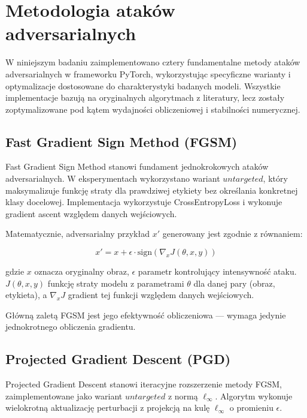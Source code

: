 \documentclass[12pt]{article}
\begin{document}
\section{Metodologia ataków adversarialnych}

W niniejszym badaniu zaimplementowano cztery fundamentalne metody ataków adversarialnych w frameworku PyTorch, wykorzystując specyficzne warianty i optymalizacje dostosowane do charakterystyki badanych modeli. Wszystkie implementacje bazują na oryginalnych algorytmach z literatury, lecz zostały zoptymalizowane pod kątem wydajności obliczeniowej i stabilności numerycznej.

\subsection{Fast Gradient Sign Method (FGSM)}

Fast Gradient Sign Method \supercite{goodfellow2014explaining} stanowi fundament jednokrokowych ataków adversarialnych. W eksperymentach wykorzystano wariant $untargeted$, który maksymalizuje funkcję straty dla prawdziwej etykiety bez określania konkretnej klasy docelowej. Implementacja wykorzystuje CrossEntropyLoss i wykonuje gradient ascent względem danych wejściowych.

Matematycznie, adversarialny przykład $x'$ generowany jest zgodnie z równaniem:

\begin{equation}
    x' = x + \epsilon \cdot \text{sign}(\nabla_x J(\theta, x, y))
\end{equation}

gdzie $x$ oznacza oryginalny obraz, $\epsilon$ parametr kontrolujący intensywność ataku. $J(\theta, x, y)$ funkcję straty modelu z parametrami $\theta$ dla danej pary (obraz, etykieta), a $\nabla_x J$ gradient tej funkcji względem danych wejściowych.

Główną zaletą FGSM jest jego efektywność obliczeniowa --- wymaga jedynie jednokrotnego obliczenia gradientu.

\subsection{Projected Gradient Descent (PGD)}

Projected Gradient Descent \supercite{madry2017towards} stanowi iteracyjne rozszerzenie metody FGSM, zaimplementowane jako wariant $untargeted$ z normą $\ell_\infty$. Algorytm wykonuje wielokrotną aktualizację perturbacji z projekcją na kulę $\ell_\infty$ o promieniu $\epsilon$.
\end{document}
